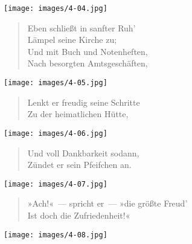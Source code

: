\documentclass[a4paper,12pt]{article}
\begin{document}
\begin{center}\texttt{[image: images/4-04.jpg]}\end{center}



\begin{verse}
Eben schließt in sanfter Ruh'\\{}
Lämpel seine Kirche zu;\\{}
Und mit Buch und Notenheften,\\{}
Nach besorgten Amtsgeschäften,
\end{verse}



\begin{center}\texttt{[image: images/4-05.jpg]}\end{center}



\begin{verse}
Lenkt er freudig seine Schritte\\{}
Zu der heimatlichen Hütte,
\end{verse}



\begin{center}\texttt{[image: images/4-06.jpg]}\end{center}



\begin{verse}
Und voll Dankbarkeit sodann,\\{}
Zündet er sein Pfeifchen an.
\end{verse}



\begin{center}\texttt{[image: images/4-07.jpg]}\end{center}



\begin{verse}
»Ach!«~— spricht er~— »die größte Freud'\\{}
Ist doch die Zufriedenheit!«
\end{verse}



\begin{center}\texttt{[image: images/4-08.jpg]}\end{center}
\end{document}
